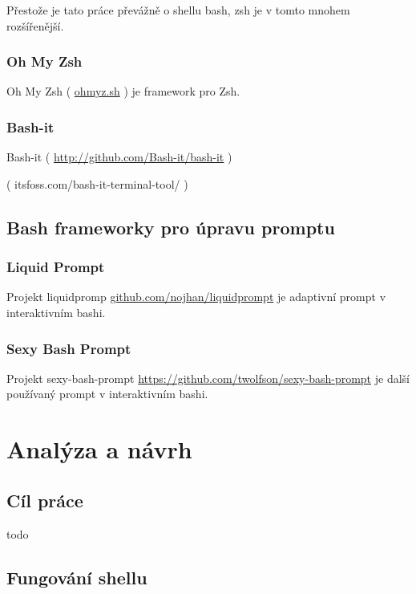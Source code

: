 \documentclass[thesis=M,czech]{FITthesis}[2012/06/26]
\begin{document}
Přestože je tato práce převážně o shellu bash, zsh je v tomto mnohem rozšířenější.

\subsection{Oh My Zsh}

Oh My Zsh ( \url{ohmyz.sh} ) je framework pro Zsh.

\subsection{Bash-it}

Bash-it ( \url{http://github.com/Bash-it/bash-it} )

( itsfoss.com/bash-it-terminal-tool/ ) 

%
%
%

\section{Bash frameworky pro úpravu promptu}

\subsection{Liquid Prompt}

Projekt liquidpromp \url{github.com/nojhan/liquidprompt} je adaptivní prompt v interaktivním bashi.

\subsection{Sexy Bash Prompt}

Projekt sexy-bash-prompt \url{https://github.com/twolfson/sexy-bash-prompt} je další používaný prompt v interaktivním bashi.



\chapter{Analýza a návrh}

\section{Cíl práce}
todo




\section{Fungování shellu}
\end{document}
